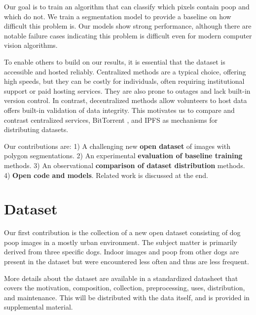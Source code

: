 \documentclass[10pt,twocolumn,letterpaper]{article}
\begin{document}
Our goal is to train an algorithm that can classify which pixels contain poop and which do not.
We train a segmentation model to provide a baseline on how
difficult this problem is. Our models show strong performance, although there
are notable failure cases indicating this problem is difficult even for modern
computer vision algorithms.

To enable others to build on our results, it is essential that the dataset is accessible and hosted
  reliably.
Centralized methods are a typical choice, offering high speeds, but they can be costly for individuals,
  often requiring institutional support or paid hosting services.
They are also prone to outages and lack built-in version control.
In contrast, decentralized methods allow volunteers to host data offers built-in validation of data
  integrity.
This motivates us to compare and contrast centralized services, BitTorrent \cite{cohen_incentives_2003}, and
  IPFS \cite{benet_ipfs_2014} as mechanisms for distributing datasets.



Our contributions are:
1) A challenging new \textbf{open dataset} of images with polygon segmentations.
2) An experimental \textbf{evaluation of baseline training} methods.
3) An observational \textbf{comparison of dataset distribution} methods.
4) \textbf{Open code and models}.
Related work is discussed at the end.


\section{Dataset}
\label{sec:dataset}

Our first contribution is the collection of a new open dataset consisting of
dog poop images in a mostly urban environment. The subject matter is primarily
derived from three specific dogs. Indoor images and poop from other dogs are
present in the dataset but were encountered less often and thus are less
frequent.

More details about the dataset are available in a standardized datasheet
\cite{gebru_datasheets_2021} that covers the motivation, composition,
collection, preprocessing, uses, distribution, and maintenance. This will be
distributed with the data itself, and is provided in supplemental material.
\end{document}
